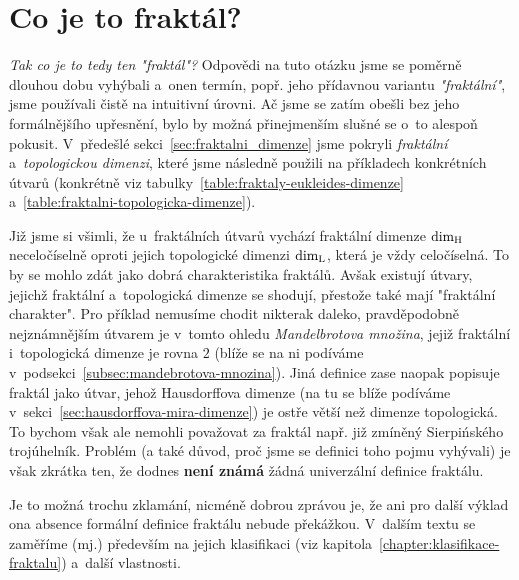 \section{Co je to fraktál?}\label{sec:co-je-to-fraktal}
\emph{Tak co je to tedy ten "fraktál"?} Odpovědi na tuto otázku jsme se poměrně dlouhou dobu vyhýbali a~onen termín, popř. jeho přídavnou variantu \emph{"fraktální"}, jsme používali čistě na intuitivní úrovni. Ač jsme se zatím obešli bez jeho formálnějšího upřesnění, bylo by možná přinejmenším slušné se o~to alespoň pokusit. V~předešlé sekci~\ref{sec:fraktalni_dimenze} jsme pokryli \emph{fraktální} a~\emph{topologickou dimenzi}, které jsme následně použili na příkladech konkrétních útvarů (konkrétně viz tabulky~\ref{table:fraktaly-eukleides-dimenze} a~\ref{table:fraktalni-topologicka-dimenze}).

Již jsme si všimli, že u~fraktálních útvarů vychází fraktální dimenze $\operatorname{dim_H}$ neceločíselně oproti jejich topologické dimenzi $\operatorname{dim_L}$, která je vždy celočíselná. To by se mohlo zdát jako dobrá charakteristika fraktálů. Avšak existují útvary, jejichž fraktální a~topologická dimenze se shodují, přestože také mají "fraktální charakter". Pro příklad nemusíme chodit nikterak daleko, pravděpodobně nejznámnějším útvarem je v~tomto ohledu \emph{Mandelbrotova množina}, jejiž fraktální i~topologická dimenze je rovna $2$ (blíže se na ni podíváme v~podsekci~\ref{subsec:mandebrotova-mnozina}). Jiná definice zase naopak popisuje fraktál jako útvar, jehož Hausdorffova dimenze (na tu se blíže podíváme v~sekci~\ref{sec:hausdorffova-mira-dimenze}) je ostře větší než dimenze topologická. To bychom však ale nemohli považovat za fraktál např. již zmíněný Sierpińského trojúhelník. Problém (a také důvod, proč jsme se definici toho pojmu vyhývali) je však zkrátka ten, že dodnes \textbf{není známá} žádná univerzální definice fraktálu. \cite[str. 226]{Voracova2022}

Je to možná trochu zklamání, nicméně dobrou zprávou je, že ani pro další výklad ona absence formální definice fraktálu nebude překážkou. V~dalším textu se zaměříme (mj.) především na jejich klasifikaci (viz kapitola~\ref{chapter:klasifikace-fraktalu}) a~další vlastnosti.
